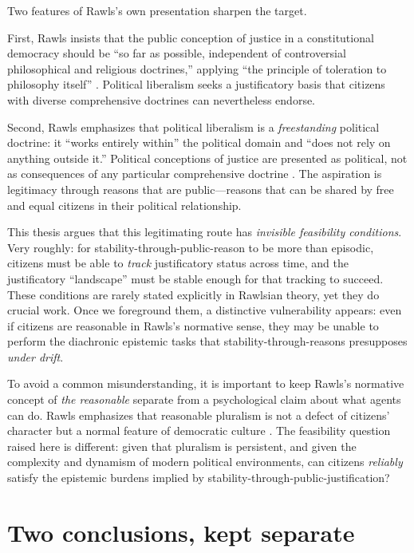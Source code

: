 \documentclass[12pt]{report}
\begin{document}
Two features of Rawls's own presentation sharpen the target.

First, Rawls insists that the public conception of justice in a constitutional democracy should be ``so far as possible, independent of controversial philosophical and religious doctrines,'' applying ``the principle of toleration to philosophy itself'' \parencite[p.~223]{rawls1985justice}.  Political liberalism seeks a justificatory basis that citizens with diverse comprehensive doctrines can nevertheless endorse.

Second, Rawls emphasizes that political liberalism is a \emph{freestanding} political doctrine: it ``works entirely within'' the political domain and ``does not rely on anything outside it.'' Political conceptions of justice are presented as political, not as consequences of any particular comprehensive doctrine \parencite[p.~133]{rawls1995reply}.  The aspiration is legitimacy through reasons that are public---reasons that can be shared by free and equal citizens in their political relationship.

This thesis argues that this legitimating route has \emph{invisible feasibility conditions}.  Very roughly: for stability-through-public-reason to be more than episodic, citizens must be able to \emph{track} justificatory status across time, and the justificatory ``landscape'' must be stable enough for that tracking to succeed.  These conditions are rarely stated explicitly in Rawlsian theory, yet they do crucial work.  Once we foreground them, a distinctive vulnerability appears: even if citizens are reasonable in Rawls's normative sense, they may be unable to perform the diachronic epistemic tasks that stability-through-reasons presupposes \emph{under drift}.

To avoid a common misunderstanding, it is important to keep Rawls's normative concept of \emph{the reasonable} separate from a psychological claim about what agents can do.  Rawls emphasizes that reasonable pluralism is not a defect of citizens' character but a normal feature of democratic culture \parencite[p.~766]{rawls1997public}.  The feasibility question raised here is different: given that pluralism is persistent, and given the complexity and dynamism of modern political environments, can citizens \emph{reliably} satisfy the epistemic burdens implied by stability-through-public-justification?

\section{Two conclusions, kept separate}
\end{document}
